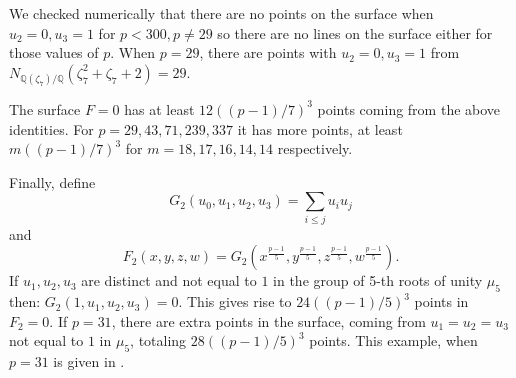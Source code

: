 \documentclass[12pt]{amsart}
\theoremstyle{definition}
\begin{document}
We checked numerically that there are no points on the surface when $u_2=0,u_3=1$ for $p<300,p \ne 29$ so there are no lines on the surface either for those values of $p$. When $p=29$, there are points with $u_2=0,u_3=1$ from $N_{{\mathbb Q}(\zeta_7)/{\mathbb Q}}(\zeta_7^2+\zeta_7+2)=29$.

The surface $F=0$ has at least $12((p-1)/7)^3$ points coming from the above identities. 
For $p=29,43,71,239,337$ it has more points, at least $m((p-1)/7)^3$ for $m=18,17,16,14,14$ respectively.

\bigskip

Finally, define
$$
G_2(u_0, u_1, u_2, u_3)=\sum_{i\le j} u_iu_j
$$
and
$$
F_2\left(x, y, z, w\right)=G_2(x^{\frac{p-1}{5}}, y^{\frac{p-1}{5}}, z^{\frac{p-1}{5}}, w^{\frac{p-1}{5}}).%
$$
If $u_1,u_2,u_3$ are distinct and not equal to $1$ in the group of 5-th roots of unity $\mu_5$ then:
$G_2(1,u_1,u_2,u_3)=0$. This gives rise to $24((p-1)/5)^3$ points in $F_2=0$. If $p=31$, there are extra points
in the surface, coming from $u_1=u_2=u_3$ not equal to $1$ in $\mu_5$, totaling $28((p-1)/5)^3$ points. This example, when $p=31$ is given in \cite{Voloch}.


\end{document}
